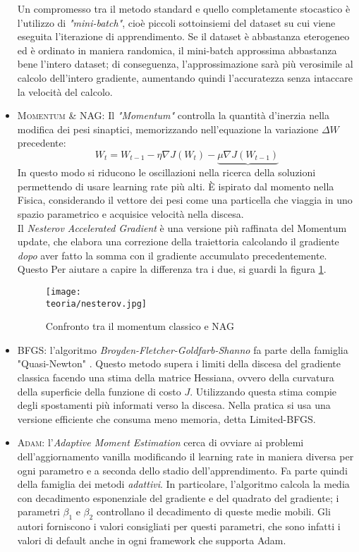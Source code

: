 \begin{itemize}
Un compromesso tra il metodo standard e quello completamente stocastico è l'utilizzo di \emph{"mini-batch"}, cioè piccoli sottoinsiemi del dataset su cui viene eseguita l'iterazione di apprendimento. Se il dataset è abbastanza eterogeneo ed è ordinato in maniera randomica, il mini-batch approssima abbastanza bene l'intero dataset; di conseguenza, l'approssimazione sarà più verosimile al calcolo dell'intero gradiente, aumentando quindi l'accuratezza senza intaccare la velocità del calcolo. 
\item \textsc{Momentum \& NAG}: Il \emph{"Momentum"} controlla la quantità d'inerzia nella modifica dei pesi sinaptici, memorizzando nell'equazione la variazione $\Delta W$ precedente:
$$
W_{t} = W_{t-1} - \eta \nabla J(W_{t})- \underbrace{\mu\nabla 
J(W_{t-1})} 
$$ 
In questo modo si riducono le oscillazioni nella ricerca della soluzioni permettendo di usare learning rate più alti. È ispirato dal momento nella Fisica, considerando il vettore dei pesi come una particella che viaggia in uno spazio parametrico e acquisice velocità nella discesa. \\
Il \emph{Nesterov Accelerated Gradient} è una versione più raffinata del Momentum update, che elabora una correzione della traiettoria calcolando il gradiente \emph{dopo} aver fatto la somma con il gradiente accumulato precedentemente. Questo  Per aiutare a capire la differenza tra i due, si guardi la figura \ref{fig:nag}.
\begin{figure}[h!]
 \centering
 \texttt{[image: \\teoria/nesterov.jpg]}
 \caption{Confronto tra il momentum classico e NAG}
 \label{fig:nag}
\end{figure}
\item \textsc{BFGS}: l'algoritmo \emph{Broyden-Fletcher-Goldfarb-Shanno} fa parte della famiglia "Quasi-Newton" \parencite{Wquasinewton}. Questo metodo supera i limiti della discesa del gradiente classica facendo una stima della matrice Hessiana, ovvero della curvatura della superficie della funzione di costo $J$. Utilizzando questa stima compie degli spostamenti più informati verso la discesa. Nella pratica si usa una versione efficiente che consuma meno memoria, detta Limited-BFGS\parencite{WLBFGS}. 

\item \textsc{Adam}: l'\emph{Adaptive Moment Estimation} cerca di ovviare ai problemi dell'aggiornamento vanilla modificando il learning rate in maniera diversa per ogni parametro e a seconda dello stadio dell'apprendimento. Fa parte quindi della famiglia dei metodi \emph{adattivi}. In particolare, l'algoritmo calcola la media con decadimento esponenziale del gradiente e del quadrato del gradiente; i parametri $\beta_1$ e $\beta_2$ controllano il decadimento di queste medie mobili. Gli autori forniscono i valori consigliati per questi parametri, che sono infatti i valori di default anche in ogni framework che supporta Adam\parencite{WAdam}.
\end{itemize}


